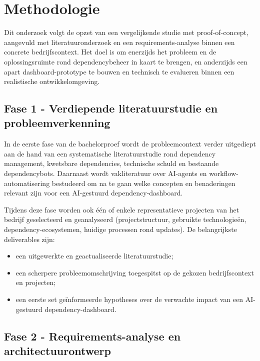 \section{Methodologie}
\label{sec:methodologie}

Dit onderzoek volgt de opzet van een vergelijkende studie met proof-of-concept, aangevuld met literatuuronderzoek en een requirements-analyse binnen een concrete bedrijfscontext. Het doel is om enerzijds het probleem en de oplossingsruimte rond dependencybeheer in kaart te brengen, en anderzijds een apart dashboard-prototype te bouwen en technisch te evalueren binnen een realistische ontwikkelomgeving.

\subsection{Fase 1 - Verdiepende literatuurstudie en probleemverkenning}
\label{sec:fase1}

In de eerste fase van de bachelorproef wordt de probleemcontext verder uitgediept aan de hand van een systematische literatuurstudie rond dependency management, kwetsbare dependencies, technische schuld en bestaande dependencybots. Daarnaast wordt vakliteratuur over AI-agents en workflow-automatisering bestudeerd om na te gaan welke concepten en benaderingen relevant zijn voor een AI-gestuurd dependency-dashboard.

Tijdens deze fase worden ook één of enkele representatieve projecten van het bedrijf geselecteerd en geanalyseerd (projectstructuur, gebruikte technologieën, dependency-ecosystemen, huidige processen rond updates). De belangrijkste deliverables zijn:
\begin{itemize}
  \item een uitgewerkte en geactualiseerde literatuurstudie;
  \item een scherpere probleemomschrijving toegespitst op de gekozen bedrijfscontext en projecten;
  \item een eerste set geïnformeerde hypotheses over de verwachte impact van een AI-gestuurd dependency-dashboard.
\end{itemize}

\subsection{Fase 2 - Requirements-analyse en architectuurontwerp}
\label{sec:fase2}

